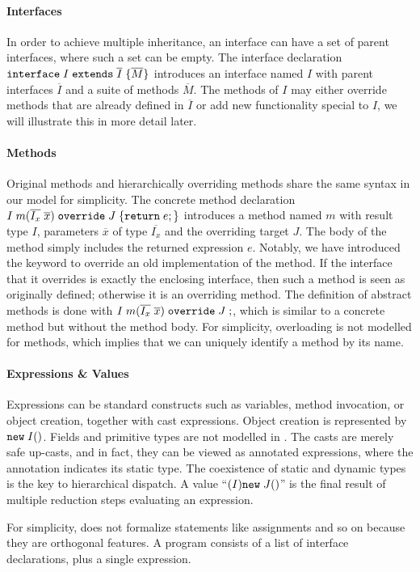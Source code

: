 \paragraph{Interfaces}
In order to achieve multiple inheritance, an interface can have a set of 
parent interfaces, where such a set can be empty. The interface declaration $\texttt{interface} \; I \; \texttt{extends} \; \overline{I} \; {\{} \overline{M} {\}}$ introduces an interface named $I$ with parent interfaces $\overline{I}$ and a suite of methods $\overline{M}$. The methods of $I$ may either override methods that are already defined in $\overline{I}$ or add new functionality special to $I$, we will illustrate this in more detail later.

\paragraph{Methods}
Original methods and hierarchically overriding methods share the same syntax in our model for simplicity.
The concrete method declaration $I \; m (\overline{I_x} \; \overline{x}) \; \texttt{override} \; J \; {\{} \texttt{return} \; e ; {\}}$ introduces a
method named $m$ with result type $I$, parameters $\overline{x}$ of
type $\overline{I_x}$ and the overriding target $J$. The body of the
method simply includes the returned expression $e$. Notably, we have introduced the
\kwoverride{} keyword to override an old implementation of the
method. If the interface that it overrides is exactly the enclosing
interface, then such a method is seen as originally defined; otherwise it is an overriding method. The definition
of abstract methods is done with $I \; m (\overline{I_x} \; \overline{x}) \; \texttt{override} \; J \; ;$, which is
similar to a concrete method but without the method body. 
For simplicity, overloading is not modelled for methods, which
implies that we can uniquely identify a method by its name.

\paragraph{Expressions \& Values}
Expressions can be standard constructs such as variables, method
invocation, or object creation, together with cast expressions. 
Object creation is represented by $\texttt{new} \; I()$. Fields and primitive types are not modelled in \MIM{}. 
The casts are merely safe up-casts, and in fact, they can be viewed as
annotated expressions, where the annotation indicates its static type.
The coexistence of static and dynamic types is the key to hierarchical dispatch.
A value
``$(I)\texttt{new} \; J()$''
is the final result of multiple reduction steps evaluating an
expression.

For simplicity, \name{} does not formalize statements like assignments and so on because they are orthogonal features.
A program consists of a list of interface declarations, plus a single expression.

